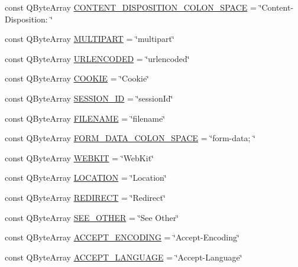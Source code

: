 \begin{DoxyCompactItemize}
\item 
const Q\+Byte\+Array \hyperlink{namespace_h_t_t_p_a873d44427d69692f3aba64f544342e0d}{C\+O\+N\+T\+E\+N\+T\+\_\+\+D\+I\+S\+P\+O\+S\+I\+T\+I\+O\+N\+\_\+\+C\+O\+L\+O\+N\+\_\+\+S\+P\+A\+CE} = \char`\"{}Content-\/Disposition\+: \char`\"{}
\item 
const Q\+Byte\+Array \hyperlink{namespace_h_t_t_p_aefd196061882184b0d2ad4010aebd444}{M\+U\+L\+T\+I\+P\+A\+RT} = \char`\"{}multipart\char`\"{}
\item 
const Q\+Byte\+Array \hyperlink{namespace_h_t_t_p_a4f6dbdcd7e2183bda552ac348b855982}{U\+R\+L\+E\+N\+C\+O\+D\+ED} = \char`\"{}urlencoded\char`\"{}
\item 
const Q\+Byte\+Array \hyperlink{namespace_h_t_t_p_a24525edd54eca0e7b4d727f226cc167b}{C\+O\+O\+K\+IE} = \char`\"{}Cookie\char`\"{}
\item 
const Q\+Byte\+Array \hyperlink{namespace_h_t_t_p_a94085bad2b083d5e7ee522412ad285fc}{S\+E\+S\+S\+I\+O\+N\+\_\+\+ID} = \char`\"{}session\+Id\char`\"{}
\item 
const Q\+Byte\+Array \hyperlink{namespace_h_t_t_p_a404ec6d0735646b8d66bca137b88eb07}{F\+I\+L\+E\+N\+A\+ME} = \char`\"{}filename\char`\"{}
\item 
const Q\+Byte\+Array \hyperlink{namespace_h_t_t_p_a87b909cf3e3f263e0ae3433ee727cdcd}{F\+O\+R\+M\+\_\+\+D\+A\+T\+A\+\_\+\+C\+O\+L\+O\+N\+\_\+\+S\+P\+A\+CE} = \char`\"{}form-\/data; \char`\"{}
\item 
const Q\+Byte\+Array \hyperlink{namespace_h_t_t_p_a4d38b03b55e954176bdcb245e8d45401}{W\+E\+B\+K\+IT} = \char`\"{}Web\+Kit\char`\"{}
\item 
const Q\+Byte\+Array \hyperlink{namespace_h_t_t_p_ac3500f0969207966a93850384561e2ed}{L\+O\+C\+A\+T\+I\+ON} = \char`\"{}Location\char`\"{}
\item 
const Q\+Byte\+Array \hyperlink{namespace_h_t_t_p_a03c1e9f50e05c0cad2a62aff6880e889}{R\+E\+D\+I\+R\+E\+CT} = \char`\"{}Redirect\char`\"{}
\item 
const Q\+Byte\+Array \hyperlink{namespace_h_t_t_p_abb4b6f02aaa86ea776f9094230c1fa2e}{S\+E\+E\+\_\+\+O\+T\+H\+ER} = \char`\"{}See Other\char`\"{}
\item 
const Q\+Byte\+Array \hyperlink{namespace_h_t_t_p_a236086e2404d46444b5d85e401fbfbdd}{A\+C\+C\+E\+P\+T\+\_\+\+E\+N\+C\+O\+D\+I\+NG} = \char`\"{}Accept-\/Encoding\char`\"{}
\item 
const Q\+Byte\+Array \hyperlink{namespace_h_t_t_p_a3325fc8aa2382ee033c597c67ae8b7a3}{A\+C\+C\+E\+P\+T\+\_\+\+L\+A\+N\+G\+U\+A\+GE} = \char`\"{}Accept-\/Language\char`\"{}

\end{DoxyCompactItemize}
